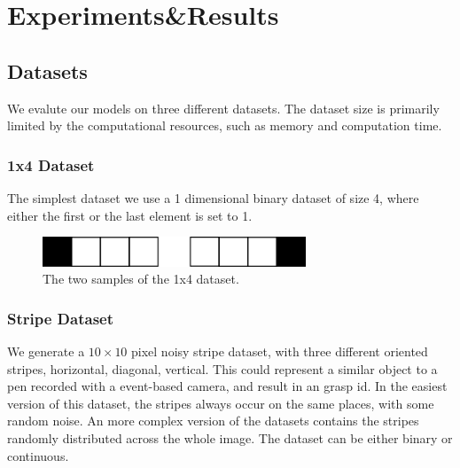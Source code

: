\chapter{Experiments\&Results}

\section{Datasets}

We evalute our models on three different datasets.
The dataset size is primarily limited by the computational resources, such as memory and computation time. 

\subsection{1x4 Dataset}

The simplest dataset we use a 1 dimensional binary dataset of size 4, where either the first or the last element is set to 1. 

\begin{figure}[h!]
	\centering
    	\includegraphics[width=0.7\textwidth]{imgs/1x4_ds.png} 
    \caption{The two samples of the 1x4 dataset.}
	\label{fig:test}
\end{figure}

\subsection{Stripe Dataset}

We generate a $10 \times 10$ pixel noisy stripe dataset, with three different oriented stripes, horizontal, diagonal, vertical. 
This could represent a similar object to a pen recorded with a event-based camera, and result in an grasp id.
In the easiest version of this dataset, the stripes always occur on the same places, with some random noise.
An more complex version of the datasets contains the stripes randomly distributed across the whole image.
The dataset can be either binary or continuous.


